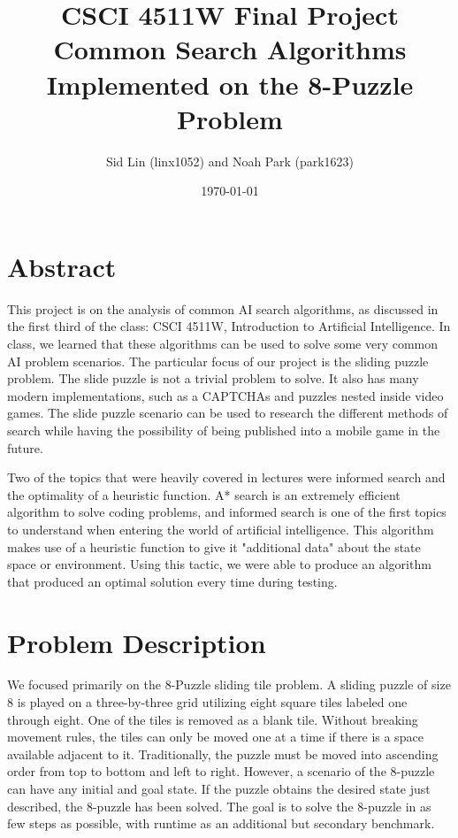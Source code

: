 \documentclass[titlepage]{article}
\title{
	CSCI 4511W Final Project \\
	\large Common Search Algorithms Implemented on the 8-Puzzle Problem
}
\date{\today}
\author{Sid Lin (linx1052) and Noah Park (park1623)}
\begin{document}
\maketitle

\section{Abstract}
This project is on the analysis of common AI search algorithms, as discussed in the first third of the class: CSCI 4511W, Introduction to Artificial Intelligence. In class, we learned that these algorithms can be used to solve some very common AI problem scenarios. The particular focus of our project is the sliding puzzle problem. The slide puzzle is not a trivial problem to solve. It also has many modern implementations, such as a CAPTCHAs and puzzles nested inside video games. The slide puzzle scenario can be used to research the different methods of search while having the possibility of being published into a mobile game in the future. 
\newline

Two of the topics that were heavily covered in lectures were  informed search and the optimality of a heuristic function. A* search is an extremely efficient algorithm to solve coding problems, and informed search  is one of the first topics to understand when entering the world of artificial intelligence. This algorithm makes use of a heuristic function to give it "additional data" about the state space or environment. Using this tactic, we were able to produce an algorithm that produced an optimal solution every time during testing. 
\newpage

\section{Problem Description}
We focused primarily on the 8-Puzzle sliding tile problem. A sliding puzzle of size 8 is played on a three-by-three grid utilizing eight square tiles labeled one through eight. One of the tiles is removed as a blank tile. Without breaking movement rules, the tiles can only be moved one at a time if there is a space available adjacent to it. Traditionally, the puzzle must be moved into ascending order from top to bottom and left to right. However, a scenario of the 8-puzzle can have any initial and goal state. If the puzzle obtains the desired state just described, the 8-puzzle has been solved. The goal is to solve the 8-puzzle in as few steps as possible, with runtime as an additional but secondary benchmark. 
\newpage
\end{document}
